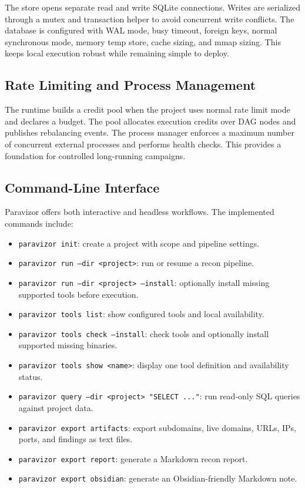 \documentclass[a4paper,12pt]{article}
\begin{document}
The store opens separate read and write SQLite connections. Writes are serialized through a mutex and transaction helper to avoid concurrent write conflicts. The database is configured with WAL mode, busy timeout, foreign keys, normal synchronous mode, memory temp store, cache sizing, and mmap sizing. This keeps local execution robust while remaining simple to deploy.

\subsection{Rate Limiting and Process Management}

The runtime builds a credit pool when the project uses normal rate limit mode and declares a budget. The pool allocates execution credits over DAG nodes and publishes rebalancing events. The process manager enforces a maximum number of concurrent external processes and performs health checks. This provides a foundation for controlled long-running campaigns.

\subsection{Command-Line Interface}

Paravizor offers both interactive and headless workflows. The implemented commands include:

\begin{itemize}
    \item \texttt{paravizor init}: create a project with scope and pipeline settings.
    \item \texttt{paravizor run --dir <project>}: run or resume a recon pipeline.
    \item \texttt{paravizor run --dir <project> --install}: optionally install missing supported tools before execution.
    \item \texttt{paravizor tools list}: show configured tools and local availability.
    \item \texttt{paravizor tools check --install}: check tools and optionally install supported missing binaries.
    \item \texttt{paravizor tools show <name>}: display one tool definition and availability status.
    \item \texttt{paravizor query --dir <project> "SELECT ..."}: run read-only SQL queries against project data.
    \item \texttt{paravizor export artifacts}: export subdomains, live domains, URLs, IPs, ports, and findings as text files.
    \item \texttt{paravizor export report}: generate a Markdown recon report.
    \item \texttt{paravizor export obsidian}: generate an Obsidian-friendly Markdown note.
\end{itemize}
\end{document}
